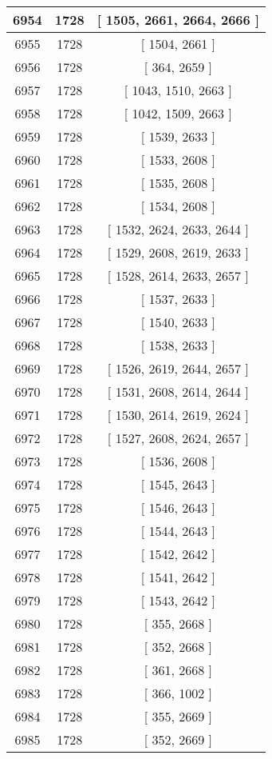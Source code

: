 \begin{center}
\begin{longtable}[H]{|| c c c ||}
6954 & 1728 & [ 1505, 2661, 2664, 2666 ] \\ 
\hline
6955 & 1728 & [ 1504, 2661 ] \\ 
\hline
6956 & 1728 & [ 364, 2659 ] \\ 
\hline
6957 & 1728 & [ 1043, 1510, 2663 ] \\ 
\hline
6958 & 1728 & [ 1042, 1509, 2663 ] \\ 
\hline
6959 & 1728 & [ 1539, 2633 ] \\ 
\hline
6960 & 1728 & [ 1533, 2608 ] \\ 
\hline
6961 & 1728 & [ 1535, 2608 ] \\ 
\hline
6962 & 1728 & [ 1534, 2608 ] \\ 
\hline
6963 & 1728 & [ 1532, 2624, 2633, 2644 ] \\ 
\hline
6964 & 1728 & [ 1529, 2608, 2619, 2633 ] \\ 
\hline
6965 & 1728 & [ 1528, 2614, 2633, 2657 ] \\ 
\hline
6966 & 1728 & [ 1537, 2633 ] \\ 
\hline
6967 & 1728 & [ 1540, 2633 ] \\ 
\hline
6968 & 1728 & [ 1538, 2633 ] \\ 
\hline
6969 & 1728 & [ 1526, 2619, 2644, 2657 ] \\ 
\hline
6970 & 1728 & [ 1531, 2608, 2614, 2644 ] \\ 
\hline
6971 & 1728 & [ 1530, 2614, 2619, 2624 ] \\ 
\hline
6972 & 1728 & [ 1527, 2608, 2624, 2657 ] \\ 
\hline
6973 & 1728 & [ 1536, 2608 ] \\ 
\hline
6974 & 1728 & [ 1545, 2643 ] \\ 
\hline
6975 & 1728 & [ 1546, 2643 ] \\ 
\hline
6976 & 1728 & [ 1544, 2643 ] \\ 
\hline
6977 & 1728 & [ 1542, 2642 ] \\ 
\hline
6978 & 1728 & [ 1541, 2642 ] \\ 
\hline
6979 & 1728 & [ 1543, 2642 ] \\ 
\hline
6980 & 1728 & [ 355, 2668 ] \\ 
\hline
6981 & 1728 & [ 352, 2668 ] \\ 
\hline
6982 & 1728 & [ 361, 2668 ] \\ 
\hline
6983 & 1728 & [ 366, 1002 ] \\ 
\hline
6984 & 1728 & [ 355, 2669 ] \\ 
\hline
6985 & 1728 & [ 352, 2669 ] \\ 

\end{longtable}
\end{center}
